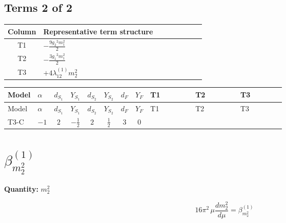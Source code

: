 \documentclass[8pt]{article}
\begin{document}
\begin{landscape}
\subsection*{Terms 2 of 2}
\begin{center}
\begin{tabular}{@{}c >{\raggedright\arraybackslash}p{0.82\linewidth}@{}}
\toprule
Column & Representative term structure \\
\midrule
T1 & \(\displaystyle -\frac{9 {g_2}^2 {m_1^2}}{2}\) \\
\midrule
T2 & \(\displaystyle -\frac{3 {g_1}^2 {m_1^2}}{2}\) \\
\midrule
T3 & \(\displaystyle +4 {\lambda_{12}^{(1)}} {m_2^2}\) \\
\midrule
\bottomrule
\end{tabular}
\end{center}
\smallskip
\tiny
\begin{longtable}{@{}llcccccc >{\raggedright\arraybackslash}p{0.21\linewidth} >{\raggedright\arraybackslash}p{0.21\linewidth} >{\raggedright\arraybackslash}p{0.21\linewidth}@{}}
\toprule
Model & $\alpha$ & $d_{S_1}$ & $Y_{S_1}$ & $d_{S_2}$ & $Y_{S_2}$ & $d_F$ & $Y_F$ & T1 & T2 & T3 \\
\midrule
\endfirsthead
\toprule
Model & $\alpha$ & $d_{S_1}$ & $Y_{S_1}$ & $d_{S_2}$ & $Y_{S_2}$ & $d_F$ & $Y_F$ & T1 & T2 & T3 \\
\midrule
\endhead
T3-C & $-1$ & $2$ & $-\frac{1}{2}$ & $2$ & $\frac{1}{2}$ & $3$ & $0$ & \scriptsize\adjustbox{max width=\linewidth}{$\begin{gathered} -\frac{9 {g_2}^2 {m_1^2}}{2}\end{gathered}$} & \scriptsize\adjustbox{max width=\linewidth}{$\begin{gathered} -\frac{3 {g_1}^2 {m_1^2}}{2}\end{gathered}$} & \scriptsize\adjustbox{max width=\linewidth}{$\begin{gathered} +4 {\lambda_{12}^{(1)}} {m_2^2}\end{gathered}$} \\
\midrule
\bottomrule
\end{longtable}
\clearpage
\section*{$\beta_{m_2^2}^{(1)}$}
\noindent\textbf{Quantity: }$m_2^2$\par\smallskip
\[16\pi^2\,\mu\frac{d m_2^2}{d\mu}=\beta_{m_2^2}^{(1)}\]

\end{landscape}
\end{document}
